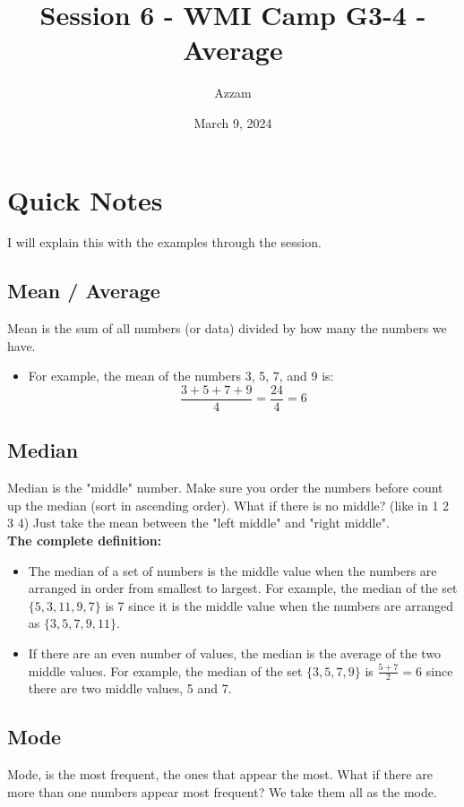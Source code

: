 \documentclass[11pt]{scrartcl}
\begin{document}
    \title{Session 6 - WMI Camp G3-4 - Average}
    \date{March 9, 2024}
    \author{Azzam}
    \maketitle

\section{Quick Notes}
I will explain this with the examples through the session.
\subsection{Mean / Average}
    Mean is the sum of all numbers (or data) divided by how many the numbers we have.
    \begin{itemize}
        \item For example, the mean of the numbers 3, 5, 7, and 9 is:
\[
\frac{3 + 5 + 7 + 9}{4} = \frac{24}{4} = 6
\]
    \end{itemize}


\subsection{Median}
    Median is the "middle" number. Make sure you order the numbers before count up the median (sort in ascending order). What if there is no middle? (like in 1 2 3 4) Just take the mean between the "left middle" and "right middle".\\
    \textbf{The complete definition:}
\begin{itemize}
    \item The median of a set of numbers is the middle value when the numbers are arranged in order from smallest to largest. For example, the median of the set $\{5, 3, 11, 9, 7\}$ is 7 since it is the middle value when the numbers are arranged as $\{3, 5, 7, 9, 11\}$.

    \item If there are an even number of values, the median is the average of the two middle values. For example, the median of the set $\{3, 5, 7, 9\}$ is $\frac{5 + 7}{2} = 6$ since there are two middle values, 5 and 7.
\end{itemize}

\newpage
\subsection{Mode}
    Mode, is the most frequent, the ones that appear the most. What if there are more than one numbers appear most frequent? We take them all as the mode.
\end{document}
